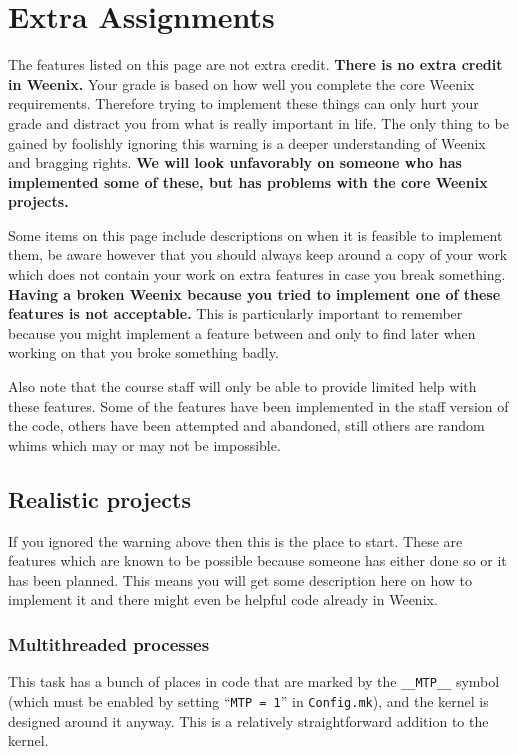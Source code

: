 \chapter{Extra Assignments}
\label{extra-asgn}


The features listed on this page are not extra credit. \textbf{There is no extra credit in Weenix.} Your grade is based on how well you complete the core Weenix requirements. Therefore trying to implement these things can only hurt your grade and distract you from what is really important in life. The only thing to be gained by foolishly ignoring this warning is a deeper understanding of Weenix and bragging rights. \textbf{We will look unfavorably on someone who has implemented some of these, but has problems with the core Weenix projects.}

Some items on this page include descriptions on when it is feasible to implement them, be aware however that you should always keep around a copy of your work which does not contain your work on extra features in case you break something. \textbf{Having a broken Weenix because you tried to implement one of these features is not acceptable.} This is particularly important to remember because you might implement a feature between  and  only to find later when working on  that you broke something badly.

Also note that the course staff will only be able to provide limited help with these features. Some of the features have been implemented in the staff version of the code, others have been attempted and abandoned, still others are random whims which may or may not be impossible.

\section{Realistic projects}
If you ignored the warning above then this is the place to start. These are features which are known to be possible because someone has either done so or it has been planned. This means you will get some description here on how to implement it and there might even be helpful code already in Weenix.

\subsection{Multithreaded processes}
This task has a bunch of places in code that are marked by the \texttt{\_\_MTP\_\_} symbol (which must be enabled by setting ``\texttt{MTP = 1}'' in \texttt{Config.mk}), and the kernel is designed around it anyway. This is a relatively straightforward addition to the kernel.

